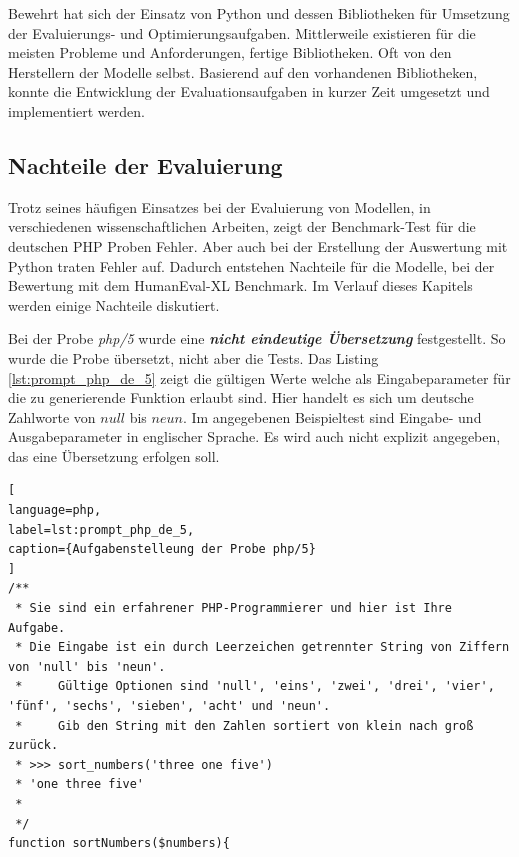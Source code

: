 Bewehrt hat sich der Einsatz von Python und dessen Bibliotheken für Umsetzung der Evaluierungs- und Optimierungsaufgaben. Mittlerweile existieren für die meisten Probleme und Anforderungen, fertige Bibliotheken. Oft von den Herstellern der Modelle selbst. Basierend auf den vorhandenen Bibliotheken, konnte die Entwicklung der Evaluationsaufgaben in kurzer Zeit umgesetzt und implementiert werden.\vspace{0.2cm}



\subsection{Nachteile der Evaluierung}\label{subsec:disadvantages_of_evaluation}
Trotz seines häufigen Einsatzes bei der Evaluierung von Modellen, in verschiedenen wissenschaftlichen Arbeiten, zeigt der Benchmark-Test für die deutschen PHP Proben Fehler. Aber auch bei der Erstellung der Auswertung mit Python traten Fehler auf. Dadurch entstehen Nachteile für die Modelle, bei der Bewertung mit dem HumanEval-XL Benchmark. Im Verlauf dieses Kapitels werden einige Nachteile diskutiert.\vspace{0.2cm}

Bei der Probe \textit{php/5} wurde eine \textit{\textbf{nicht eindeutige Übersetzung}} festgestellt. So wurde die Probe übersetzt, nicht aber die Tests. Das Listing \ref{lst:prompt_php_de_5} zeigt die gültigen Werte welche als Eingabeparameter für die zu generierende Funktion erlaubt sind. Hier handelt es sich um deutsche Zahlworte von $null$ bis $neun$. Im angegebenen Beispieltest sind Eingabe- und Ausgabeparameter in englischer Sprache. Es wird auch nicht explizit angegeben, das eine Übersetzung erfolgen soll.\vspace{0.2cm}

\begin{lstlisting}[
language=php,
label=lst:prompt_php_de_5,
caption={Aufgabenstelleung der Probe php/5}
]
/**
 * Sie sind ein erfahrener PHP-Programmierer und hier ist Ihre Aufgabe.
 * Die Eingabe ist ein durch Leerzeichen getrennter String von Ziffern von 'null' bis 'neun'.
 *     Gültige Optionen sind 'null', 'eins', 'zwei', 'drei', 'vier', 'fünf', 'sechs', 'sieben', 'acht' und 'neun'.
 *     Gib den String mit den Zahlen sortiert von klein nach groß zurück.
 * >>> sort_numbers('three one five')
 * 'one three five'
 *
 */
function sortNumbers($numbers){
\end{lstlisting}

